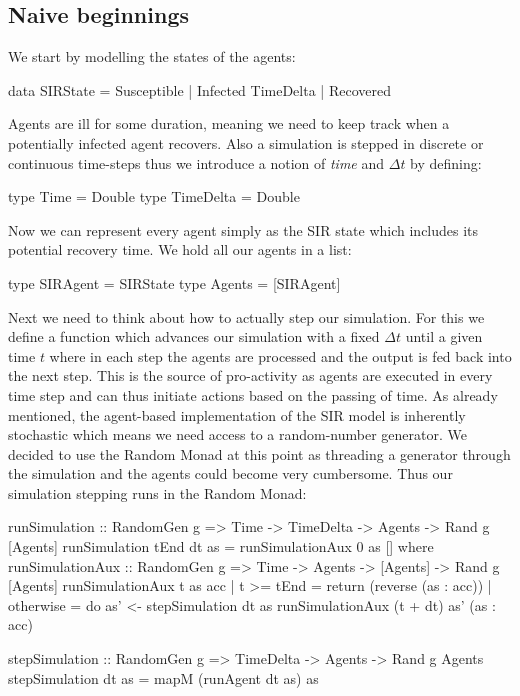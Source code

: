 \subsection{Naive beginnings}
\label{sec:naive_beginnigs}
We start by modelling the states of the agents:

\begin{HaskellCode}
data SIRState = Susceptible | Infected TimeDelta | Recovered
\end{HaskellCode}

Agents are ill for some duration, meaning we need to keep track when a potentially infected agent recovers. Also a simulation is stepped in discrete or continuous time-steps thus we introduce a notion of \textit{time} and $\Delta t$ by defining:

\begin{HaskellCode}
type Time      = Double
type TimeDelta = Double
\end{HaskellCode}

Now we can represent every agent simply as the SIR state which includes its potential recovery time. We hold all our agents in a list:
\begin{HaskellCode}
type SIRAgent = SIRState
type Agents   = [SIRAgent]
\end{HaskellCode}

Next we need to think about how to actually step our simulation. For this we define a function which advances our simulation with a fixed $\Delta t$ until a given time $t$ where in each step the agents are processed and the output is fed back into the next step. This is the source of pro-activity as agents are executed in every time step and can thus initiate actions based on the passing of time.
As already mentioned, the agent-based implementation of the SIR model is inherently stochastic which means we need access to a random-number generator. We decided to use the Random Monad at this point as threading a generator through the simulation and the agents could become very cumbersome. Thus our simulation stepping runs in the Random Monad:

\begin{HaskellCode}
runSimulation :: RandomGen g 
  => Time -> TimeDelta -> Agents -> Rand g [Agents]
runSimulation tEnd dt as = runSimulationAux 0 as []
  where
    runSimulationAux :: RandomGen g 
      => Time -> Agents -> [Agents] -> Rand g [Agents]
    runSimulationAux t as acc
      | t >= tEnd = return (reverse (as : acc))
      | otherwise = do
        as' <- stepSimulation dt as 
        runSimulationAux (t + dt) as' (as : acc)

stepSimulation :: RandomGen g 
  => TimeDelta -> Agents -> Rand g Agents
stepSimulation dt as = mapM (runAgent dt as) as
\end{HaskellCode}

